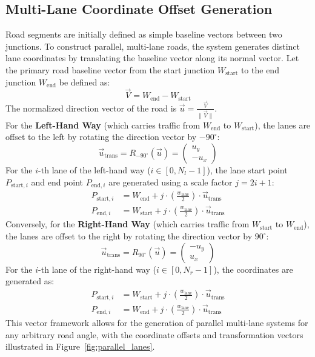 \documentclass[../report_main.tex]{subfiles}
\begin{document}
\subsection{Multi-Lane Coordinate Offset Generation}
Road segments are initially defined as simple baseline vectors between two junctions. To construct parallel, multi-lane roads, the system generates distinct lane coordinates by translating the baseline vector along its normal vector.
Let the primary road baseline vector from the start junction $W_{\text{start}}$ to the end junction $W_{\text{end}}$ be defined as:
\begin{equation}
    \overrightarrow{V} = W_{\text{end}} - W_{\text{start}}
\end{equation}
The normalized direction vector of the road is $\overrightarrow{u} = \frac{\overrightarrow{V}}{\|\overrightarrow{V}\|}$.\\
For the \textbf{Left-Hand Way} (which carries traffic from $W_{\text{end}}$ to $W_{\text{start}}$), the lanes are offset to the left by rotating the direction vector by $-90^\circ$:
\begin{equation}
    \overrightarrow{u}_{\text{trans}} = R_{-90^\circ}(\overrightarrow{u}) = \begin{pmatrix} u_y \\ -u_x \end{pmatrix}
\end{equation}
For the $i$-th lane of the left-hand way ($i \in [0, N_l - 1]$), the lane start point $P_{\text{start}, i}$ and end point $P_{\text{end}, i}$ are generated using a scale factor $j = 2i + 1$:
\begin{align}
    P_{\text{start}, i} &= W_{\text{end}} + j \cdot \left( \frac{w_{\text{lane}}}{2} \right) \cdot \overrightarrow{u}_{\text{trans}} \\
    P_{\text{end}, i} &= W_{\text{start}} + j \cdot \left( \frac{w_{\text{lane}}}{2} \right) \cdot \overrightarrow{u}_{\text{trans}}
\end{align}
Conversely, for the \textbf{Right-Hand Way} (which carries traffic from $W_{\text{start}}$ to $W_{\text{end}}$), the lanes are offset to the right by rotating the direction vector by $90^\circ$:
\begin{equation}
    \overrightarrow{u}_{\text{trans}} = R_{90^\circ}(\overrightarrow{u}) = \begin{pmatrix} -u_y \\ u_x \end{pmatrix}
\end{equation}
For the $i$-th lane of the right-hand way ($i \in [0, N_r - 1]$), the coordinates are generated as:
\begin{align}
    P_{\text{start}, i} &= W_{\text{start}} + j \cdot \left( \frac{w_{\text{lane}}}{2} \right) \cdot \overrightarrow{u}_{\text{trans}} \\
    P_{\text{end}, i} &= W_{\text{end}} + j \cdot \left( \frac{w_{\text{lane}}}{2} \right) \cdot \overrightarrow{u}_{\text{trans}}
\end{align}
This vector framework allows for the generation of parallel multi-lane systems for any arbitrary road angle, with the coordinate offsets and transformation vectors illustrated in Figure~\ref{fig:parallel_lanes}.
\end{document}
